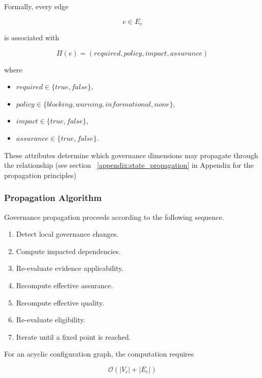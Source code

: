 \documentclass[10pt]{article}
\begin{document}
Formally, every edge

\[
e\in E_c
\]

is associated with

\begin{equation}
\Pi(e)=
(
required,
policy,
impact,
assurance
)
\label{eq:relationship_policy}
\end{equation}

where

\begin{itemize}
    \item $required\in\{true,false\}$,
    \item $policy\in
    \{
    blocking,
    warning,
    informational,
    none
    \}$,
    \item $impact\in\{true,false\}$,
    \item $assurance\in\{true,false\}$.
\end{itemize}

These attributes determine which governance dimensions may propagate through
the relationship (see section ~\ref{appendix:state_propagation} in Appendix for the propagation principles)

\subsubsection{Propagation Algorithm}

Governance propagation proceeds according to the following sequence.

\begin{enumerate}
    \item Detect local governance changes.
    \item Compute impacted dependencies.
    \item Re-evaluate evidence applicability.
    \item Recompute effective assurance.
    \item Recompute effective quality.
    \item Re-evaluate eligibility.
    \item Iterate until a fixed point is reached.
\end{enumerate}

For an acyclic configuration graph, the computation requires

\begin{equation}
\mathcal{O}
\left(
|V_c|+|E_c|
\right)
\label{eq:propagation_complexity}
\end{equation}
\end{document}
